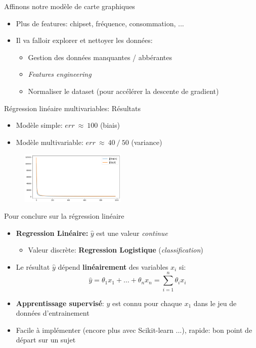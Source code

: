 \documentclass[aspectratio=169, 11pt]{beamer}
\begin{document}
\begin{frame}{Affinons notre modèle de carte graphiques}
  \begin{itemize}
  \item Plus de features: chipset, fréquence, consommation, ...
  \item Il va falloir explorer et nettoyer les données:
    \begin{itemize}
      \normalsize
    \item Gestion des données manquantes / abbérantes
    \item \textit{Features engineering}
    \item Normaliser le dataset (pour accélérer la descente de gradient)
    \end{itemize}
  \end{itemize}
\end{frame}

\begin{frame}{Régression linéaire multivariables: Résultats}
  \begin{itemize}
  \item Modèle simple: $err ~ \approx ~ 100$ (biais)
  \item Modèle multivariable: $err ~ \approx ~ 40 ~/~ 50$ (variance)
  \end{itemize}
  \begin{figure}
    \includegraphics[width=0.45\textwidth]{figs/multiVarDesc.png}\\
  \end{figure}
\end{frame}
  
\begin{frame}{Pour conclure sur la régression linéaire}
  \begin{itemize}
  \item \textbf{Regression Linéaire:} $\hat{y}$ est une valeur \textit{continue}
    \begin{itemize}
    \item Valeur discrète: \textbf{Regression Logistique} (\textit{classification})
    \end{itemize}
    \vspace{0.2cm}
  \item Le résultat $\hat{y}$ dépend \textbf{linéairement} des variables $x_{i}$ si:
    \begin{equation*}
      \hat{y} = \theta_{1}x_{1} + \dots + \theta_{n}x_{n} = \displaystyle\sum_{i=1}^{n} \theta_{i} x_{i}
    \end{equation*}
  \item \textbf{Apprentissage supervisé}: $y$ est connu pour chaque $x_{1}$ dans le jeu de données d'entrainement
  \item Facile à implémenter (encore plus avec Scikit-learn ...), rapide: bon point de départ sur un sujet
  \end{itemize}
\end{frame}
\end{document}
